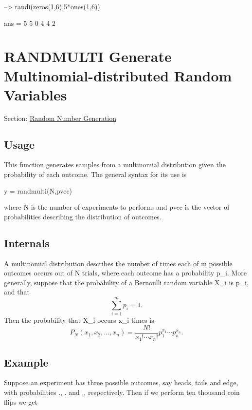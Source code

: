 \begin{DoxyVerbInclude}
--> randi(zeros(1,6),5*ones(1,6))

ans = 
 5 5 0 4 4 2 
\end{DoxyVerbInclude}
 \hypertarget{random_randmulti}{}\section{R\-A\-N\-D\-M\-U\-L\-T\-I Generate Multinomial-\/distributed Random Variables}\label{random_randmulti}
Section\-: \hyperlink{sec_random}{Random Number Generation} \hypertarget{vtkwidgets_vtkxyplotwidget_Usage}{}\subsection{Usage}\label{vtkwidgets_vtkxyplotwidget_Usage}
This function generates samples from a multinomial distribution given the probability of each outcome. The general syntax for its use is \begin{DoxyVerb}   y = randmulti(N,pvec)
\end{DoxyVerb}
 where {\ttfamily N} is the number of experiments to perform, and {\ttfamily pvec} is the vector of probabilities describing the distribution of outcomes. \hypertarget{transforms_svd_Function}{}\subsection{Internals}\label{transforms_svd_Function}
A multinomial distribution describes the number of times each of {\ttfamily m} possible outcomes occurs out of {\ttfamily N} trials, where each outcome has a probability {\ttfamily p\-\_\-i}. More generally, suppose that the probability of a Bernoulli random variable {\ttfamily X\-\_\-i} is {\ttfamily p\-\_\-i}, and that \[ \sum_{i=1}^{m} p_i = 1. \] Then the probability that {\ttfamily X\-\_\-i} occurs {\ttfamily x\-\_\-i} times is \[ P_N(x_1,x_2,\ldots,x_n) = \frac{N!}{x_1!\cdots x_n!} p_1^{x_1}\cdots p_n^{x_n}. \] \hypertarget{variables_struct_Example}{}\subsection{Example}\label{variables_struct_Example}
Suppose an experiment has three possible outcomes, say heads, tails and edge, with probabilities {.}, {.} and {.}, respectively. Then if we perform ten thousand coin flips we get


